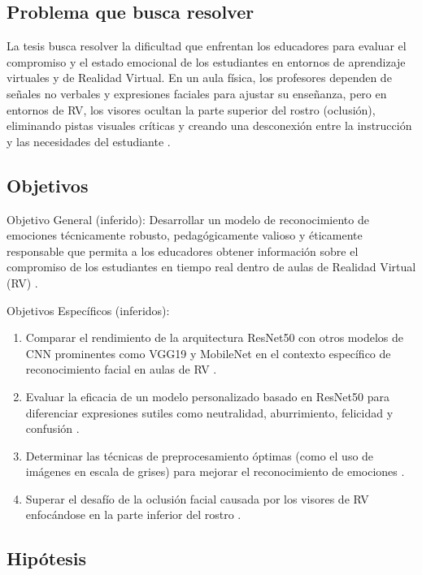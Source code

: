 \subsection{Problema que busca resolver}
La tesis busca resolver la dificultad que enfrentan los educadores para evaluar el compromiso y el estado emocional de los estudiantes en entornos de aprendizaje virtuales y de Realidad Virtual. En un aula física, los profesores dependen de señales no verbales y expresiones faciales para ajustar su enseñanza, pero en entornos de RV, los visores ocultan la parte superior del rostro (oclusión), eliminando pistas visuales críticas y creando una desconexión entre la instrucción y las necesidades del estudiante \cite{shomoye2024}.

\subsection{Objetivos}

Objetivo General (inferido): Desarrollar un modelo de reconocimiento de emociones técnicamente robusto, pedagógicamente valioso y éticamente responsable que permita a los educadores obtener información sobre el compromiso de los estudiantes en tiempo real dentro de aulas de Realidad Virtual (RV) \cite{shomoye2024}.

Objetivos Específicos (inferidos):
\begin{enumerate}
    \item Comparar el rendimiento de la arquitectura ResNet50 con otros modelos de CNN prominentes como VGG19 y MobileNet en el contexto específico de reconocimiento facial en aulas de RV \cite{shomoye2024}.
    \item Evaluar la eficacia de un modelo personalizado basado en ResNet50 para diferenciar expresiones sutiles como neutralidad, aburrimiento, felicidad y confusión \cite{shomoye2024}.
    \item Determinar las técnicas de preprocesamiento óptimas (como el uso de imágenes en escala de grises) para mejorar el reconocimiento de emociones \cite{shomoye2024}.
    \item Superar el desafío de la oclusión facial causada por los visores de RV enfocándose en la parte inferior del rostro \cite{shomoye2024}.
\end{enumerate}

\subsection{Hipótesis}

